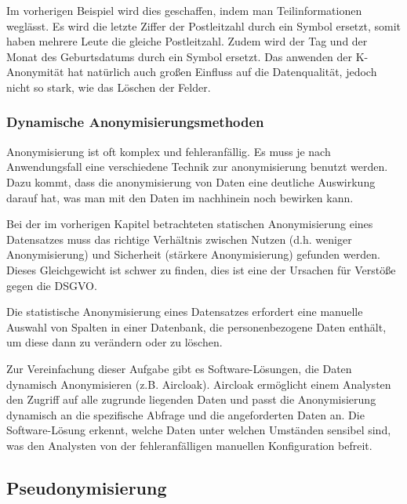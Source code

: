 \documentclass[a4paper, 12pt]{article}
\begin{document}
\noindent Im vorherigen Beispiel wird dies geschaffen, indem man Teilinformationen weglässt. Es wird die letzte Ziffer der Postleitzahl durch ein Symbol ersetzt, somit haben mehrere Leute die gleiche Postleitzahl. Zudem wird der Tag und der Monat des Geburtsdatums durch ein Symbol ersetzt. Das anwenden der K-Anonymität hat natürlich auch großen Einfluss auf die Datenqualität, jedoch nicht so stark, wie das Löschen der Felder.
\newpage

\subsubsection{Dynamische Anonymisierungsmethoden}

Anonymisierung ist oft komplex und fehleranfällig. Es muss je nach Anwendungsfall eine verschiedene Technik zur anonymisierung benutzt werden. Dazu kommt, dass die anonymisierung von Daten eine deutliche Auswirkung darauf hat, was man mit den Daten im nachhinein noch bewirken kann.

\noindent Bei der im vorherigen Kapitel betrachteten statischen Anonymisierung eines Datensatzes muss das richtige Verhältnis zwischen Nutzen (d.h. weniger Anonymisierung) und Sicherheit (stärkere Anonymisierung) gefunden werden. Dieses Gleichgewicht ist schwer zu finden, dies ist eine der Ursachen für Verstöße gegen die DSGVO. 

\noindent Die statistische Anonymisierung eines Datensatzes erfordert eine manuelle Auswahl von Spalten in einer Datenbank, die personenbezogene Daten enthält, um diese dann zu verändern oder zu löschen.

\noindent Zur Vereinfachung dieser Aufgabe gibt es Software-Lösungen, die Daten dynamisch Anonymisieren (z.B. Aircloak).
Aircloak ermöglicht einem Analysten den Zugriff auf alle zugrunde liegenden Daten und passt die Anonymisierung dynamisch an die spezifische Abfrage und die angeforderten Daten an. Die Software-Lösung erkennt,  welche Daten unter welchen Umständen sensibel sind, was den Analysten von der fehleranfälligen manuellen Konfiguration befreit.\cite{Aircloak}


\subsection{Pseudonymisierung}
\end{document}
